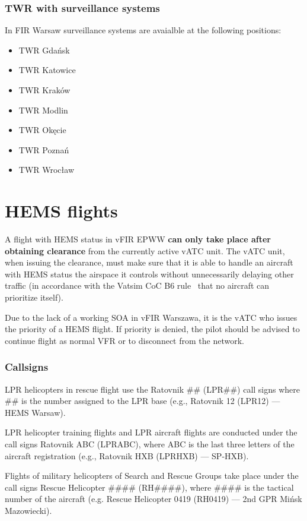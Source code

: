 \subsubsection{TWR with surveillance systems}
In FIR Warsaw surveillance systems are avaialble at the following positions:
\begin{itemize}
    \item TWR Gdańsk
    \item TWR Katowice
    \item TWR Kraków
    \item TWR Modlin
    \item TWR Okęcie
    \item TWR Poznań
    \item TWR Wrocław
\end{itemize} 

\section{HEMS flights}\label{sect:twr:hems}
A flight with HEMS status in vFIR EPWW \textbf{can only take place after obtaining clearance} from the currently active vATC unit. The vATC unit, when issuing the clearance, must make sure that it is able to handle an aircraft with HEMS status the airspace it controls without unnecessarily delaying other traffic (in accordance with the Vatsim CoC B6 rule~\cite{coc} that no aircraft can prioritize itself).

Due to the lack of a working SOA in vFIR Warszawa, it is the vATC who issues the priority of a HEMS flight. If priority is denied, the pilot should be advised to continue flight as normal VFR or to disconnect from the network.

\subsubsection{Callsigns}
LPR helicopters in rescue flight use the Ratovnik \#\# (LPR\#\#) call signs where \#\# is the number assigned to the LPR base (e.g., Ratovnik 12 (LPR12) --- HEMS Warsaw).

LPR helicopter training flights and LPR aircraft flights are conducted under the call signs Ratovnik ABC (LPRABC), where ABC is the last three letters of the aircraft registration (e.g., Ratovnik HXB (LPRHXB) --- SP-HXB).

Flights of military helicopters of Search and Rescue Groups take place under the call signs Rescue Helicopter \#\#\#\# (RH\#\#\#\#), where \#\#\#\# is the tactical number of the aircraft (e.g. Rescue Helicopter 0419 (RH0419) --- 2nd GPR Mińsk Mazowiecki).

